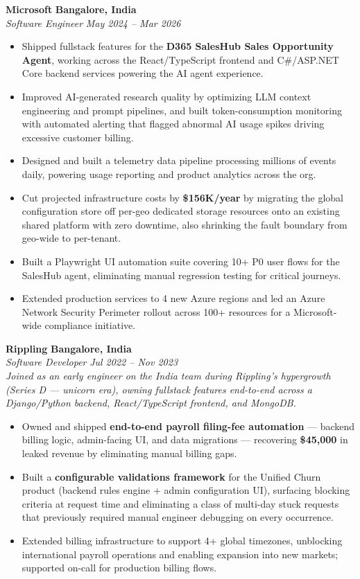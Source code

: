 \documentclass[letterpaper,10pt]{article}
\newcommand{\role}[4]{%
  \textbf{#1} \hfill \textbf{#3}\\[1pt]
  \textit{#2} \hfill \textit{#4}\\[2pt]
}
\begin{document}
\role{Microsoft}{Software Engineer}{Bangalore, India}{May 2024 -- Mar 2026}
\begin{itemize}
  \item Shipped fullstack features for the \textbf{D365 SalesHub Sales Opportunity Agent}, working across the React/TypeScript frontend and C\#/ASP.NET Core backend services powering the AI agent experience.
  \item Improved AI-generated research quality by optimizing LLM context engineering and prompt pipelines, and built token-consumption monitoring with automated alerting that flagged abnormal AI usage spikes driving excessive customer billing.
  \item Designed and built a telemetry data pipeline processing millions of events daily, powering usage reporting and product analytics across the org.
  \item Cut projected infrastructure costs by \textbf{\$156K/year} by migrating the global configuration store off per-geo dedicated storage resources onto an existing shared platform with zero downtime, also shrinking the fault boundary from geo-wide to per-tenant.
  \item Built a Playwright UI automation suite covering 10+ P0 user flows for the SalesHub agent, eliminating manual regression testing for critical journeys.
  \item Extended production services to 4 new Azure regions and led an Azure Network Security Perimeter rollout across 100+ resources for a Microsoft-wide compliance initiative.
\end{itemize}

\vspace{4pt}
\role{Rippling}{Software Developer}{Bangalore, India}{Jul 2022 -- Nov 2023}
\textit{Joined as an early engineer on the India team during Rippling's hypergrowth (Series D --- unicorn era), owning fullstack features end-to-end across a Django/Python backend, React/TypeScript frontend, and MongoDB.}
\begin{itemize}
  \item Owned and shipped \textbf{end-to-end payroll filing-fee automation} --- backend billing logic, admin-facing UI, and data migrations --- recovering \textbf{\$45,000} in leaked revenue by eliminating manual billing gaps.
  \item Built a \textbf{configurable validations framework} for the Unified Churn product (backend rules engine + admin configuration UI), surfacing blocking criteria at request time and eliminating a class of multi-day stuck requests that previously required manual engineer debugging on every occurrence.
  \item Extended billing infrastructure to support 4+ global timezones, unblocking international payroll operations and enabling expansion into new markets; supported on-call for production billing flows.
\end{itemize}
\end{document}
